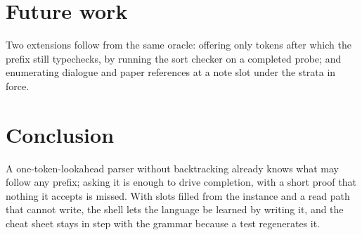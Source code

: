 \documentclass[11pt]{article}
\theoremstyle{plain}
\theoremstyle{definition}
\theoremstyle{remark}
\begin{document}
\section{Future work}
Two extensions follow from the same oracle: offering only tokens after which the prefix still
typechecks, by running the sort checker on a completed probe; and enumerating dialogue and paper
references at a note slot under the strata in force.

\section{Conclusion}
A one-token-lookahead parser without backtracking already knows what may follow any prefix; asking
it is enough to drive completion, with a short proof that nothing it accepts is missed. With slots
filled from the instance and a read path that cannot write, the shell lets the language be learned
by writing it, and the cheat sheet stays in step with the grammar because a test regenerates it.



\end{document}
